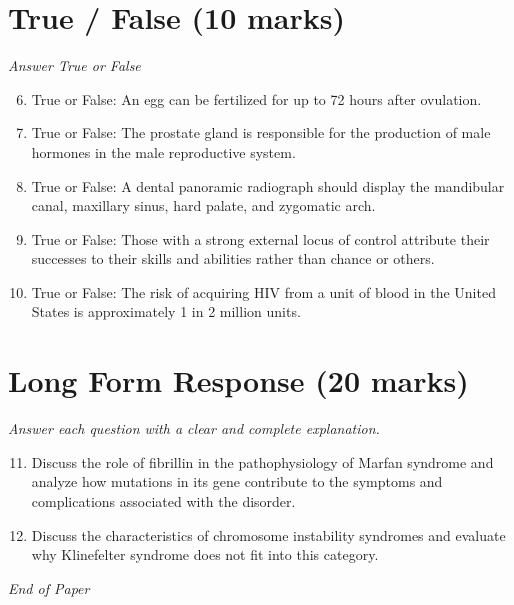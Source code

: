 \documentclass[12pt]{article}
\begin{document}
\section*{True / False (10 marks)}
\textit{Answer True or False}
\begin{enumerate}[label=\arabic*.]
\setcounter{enumi}{5}
\item True or False: An egg can be fertilized for up to 72 hours after ovulation.
\item True or False: The prostate gland is responsible for the production of male hormones in the male reproductive system.
\item True or False: A dental panoramic radiograph should display the mandibular canal, maxillary sinus, hard palate, and zygomatic arch.
\item True or False: Those with a strong external locus of control attribute their successes to their skills and abilities rather than chance or others.
\item True or False: The risk of acquiring HIV from a unit of blood in the United States is approximately 1 in 2 million units.
\end{enumerate}

\section*{Long Form Response (20 marks)}
\textit{Answer each question with a clear and complete explanation.}
\begin{enumerate}[label=\arabic*.]
\setcounter{enumi}{10}
\item Discuss the role of fibrillin in the pathophysiology of Marfan syndrome and analyze how mutations in its gene contribute to the symptoms and complications associated with the disorder.
\item Discuss the characteristics of chromosome instability syndromes and evaluate why Klinefelter syndrome does not fit into this category.
\end{enumerate}

\vfill
\noindent\textit{End of Paper}
\end{document}
